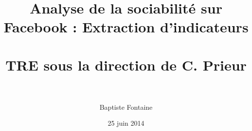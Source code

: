 
\title{Analyse de la sociabilité sur Facebook : Extraction d’indicateurs\\
    ~\\
    \large TRE sous la direction de C. Prieur\\
    ~}
\author{Baptiste Fontaine}
\date{25 juin 2014}
